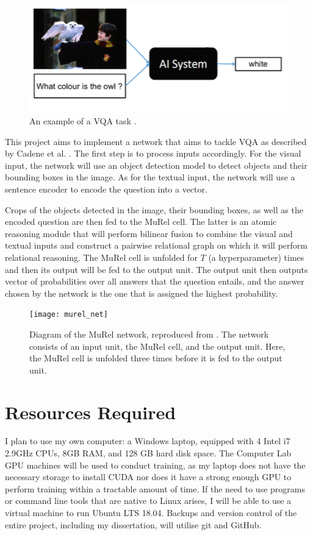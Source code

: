 \documentclass[12pt]{article}
\begin{document}
\begin{figure}[htpb]
	\centering
	\includegraphics[scale=0.55]{vqaexample}
	\caption{
		An example of a VQA task \cite{vqaexample}.
	}
\end{figure}

This project aims to implement a network that aims to tackle VQA as described by Cadene et al. \cite{murel}. The first step is to process inputs accordingly. For the visual input, the network will use an object detection model to detect objects and their bounding boxes in the image. As for the textual input, the network will use a sentence encoder to encode the question into a vector. 

Crops of the objects detected in the image, their bounding boxes, as well as the encoded question are then fed to the MuRel cell. The latter is an atomic reasoning module that will perform bilinear fusion to combine the visual and textual inputs and construct a pairwise relational graph on which it will perform relational reasoning. The MuRel cell is unfolded for $T$ (a hyperparameter) times and then its output will be fed to the output unit. The output unit then outputs vector of probabilities over all answers that the question entails, and the answer chosen by the network is the one that is assigned the highest probability.

\begin{figure}[htpb]
	\centering
	\texttt{[image: murel\_net]}
	\caption{
		Diagram of the MuRel network, reproduced from \cite{murel}. The network consists of an input unit, the MuRel cell, and the output unit. Here, the MuRel cell is unfolded three times before it is fed to the output unit.
	}
\end{figure}
\newpage

\section*{Resources Required}

I plan to use my own computer: a Windows laptop, equipped with 4 Intel i7 2.9GHz CPUs, 8GB RAM, and 128 GB hard disk space. The Computer Lab GPU machines will be used to conduct training, as my laptop does not have the necessary storage to install CUDA nor does it have a strong enough GPU to perform training within a tractable amount of time. If the need to use programs or command line tools that are native to Linux arises, I will be able to use a virtual machine to run Ubuntu LTS 18.04. Backups and version control of the entire project, including my dissertation, will utilise git and GitHub. 
\end{document}
